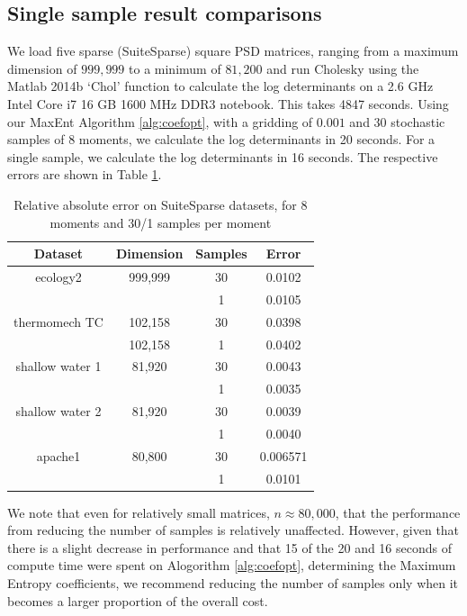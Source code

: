 \documentclass[journal]{IEEEtran}
\begin{document}
	\subsection{Single sample result comparisons}
	We load five sparse (SuiteSparse) square PSD matrices, ranging from a maximum dimension of $999,999$ to a minimum of $81,200$ and run Cholesky using the Matlab 2014b `Chol' function to calculate the log determinants on a 2.6 GHz Intel Core i7 16 GB 1600 MHz DDR3 notebook. This takes 4847 seconds. Using our MaxEnt Algorithm \ref{alg:coefopt}, with a gridding of $0.001$ and 30 stochastic samples of 8 moments, we calculate the log determinants in 20 seconds. For a single sample, we calculate the log determinants in 16 seconds.  The respective errors are shown in Table \ref{table:experiment 1}.
	\begin{table}[h!]
		\centering
		\begin{tabular}{||c c c c||} 
			\hline
			Dataset & Dimension & Samples & Error\\ [0.5ex] 
			\hline\hline
			ecology2 & 999,999 & 30 & 0.0102 \\
			&  & 1 & 0.0105\\
			\hline
			thermomech TC & 102,158 & 30 & 0.0398\\
			& 102,158 & 1 & 0.0402\\
			\hline
			shallow water 1 & 81,920 & 30 & 0.0043\\
			&  & 1 & 0.0035\\
			\hline
			shallow water 2 & 81,920 & 30 & 0.0039\\
			&  & 1 & 0.0040\\
			\hline
			apache1 & 80,800 & 30 & 0.006571\\
			&  & 1 & 0.0101\\ [0.5ex] 
			\hline
		\end{tabular}
		\newline
		\caption{Relative absolute error on SuiteSparse datasets, for 8 moments and 30/1 samples per moment}
		\label{table:experiment 1}
	\end{table}
	We note that even for relatively small matrices, $n \approx 80,000$, that the performance from reducing the number of samples is relatively unaffected. However, given that there is a slight decrease in performance and that 15 of the 20 and 16 seconds of compute time were spent on Alogorithm \ref{alg:coefopt}, determining the Maximum Entropy coefficients, we recommend reducing the number of samples only when it becomes a larger proportion of the overall cost. 
	
\end{document}
